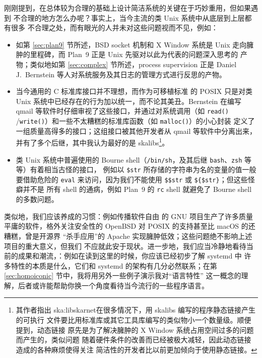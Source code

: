 刚刚提到，在总体较为合理的基础上设计简洁系统的关键在于巧妙重用，但如果遇到
不合理的地方怎么办呢？事实上，当今主流的类 Unix 系统中从底层到上层都有很多
不合理之处，而有眼光的人并未对这些问题视而不见，例如：
\begin{itemize}
\item 如第 \ref{sec:plan9} 节所述，BSD socket 机制和 X Window 系统是 Unix
	走向臃肿的里程碑，而 Plan~9 正是 Unix 先驱对以此为代表的问题深入思考的
	产物；类似地如第 \ref{sec:complex} 节所述，process supervision 正是
	Daniel J.\ Bernstein 等人对系统服务及其日志的管理方式进行反思的产物。
\item 当今通用的 C 标准库接口并不理想，而作为可移植标准
	的 POSIX 只是对类 Unix 系统中已经存在的行为加以统一，而不论其美丑。Bernstein
	在编写 qmail 等软件时仔细审视了这些接口，并通过对系统调用（如 \verb|read()|%
	/\verb|write()|）和一些不太糟糕的标准库函数（如 \verb|malloc()|）的小心封装
	定义了一组质量高得多的接口；这组接口被其他开发者从 qmail 等软件中分离出来，
	并有了多个后继，其中我认为最好的是 skalibs\footnote{其作者指出\cupercite%
	{ska:libskarnet}在很多情况下，用 skalibs 编写的程序静态链接产生的可执行
	文件要比用标准库或其它工具库编写的类似物小一个数量级。顺便提到，动态链接
	原先是为了解决臃肿的 X Window 系统占用空间过多的问题而产生的，类似问题
	随着硬件条件的改善而已经被极大减轻，因此动态链接造成的各种麻烦使得关注
	简洁性的开发者比以前更加倾向于使用静态链接。}。
\item 类 Unix 系统中普遍使用的 Bourne shell（\verb|/bin/sh|，及其后继
	\verb|bash|、\verb|zsh| 等等）有着相当古怪的接口，
	例如以 \verb|$str| 所存储的字符串为名的变量的值一般要借助危险的 \verb|eval|
	来访问，因为我们不能使用 \verb|$$str| 或 \verb|${$str}|；但这些怪癖并不是
	所有 shell 的通病，例如 Plan~9 的 \verb|rc| shell 就避免了
	Bourne shell 的多数问题。
\end{itemize}
类似地，我们应该养成的习惯：例如传播软件自由
的 GNU 项目生产了许多质量平庸的软件，格外关注安全性的
OpenBSD 对 POSIX 的支持甚至比 macOS 的还糟糕，曾是开源界
“杀手应用”的 Apache 实现臃肿低效；这些问题绝不影响上述项目的重大意义，但我们
不应就此安于现状。进一步地，我们应当冷静地看待当前的成果和潮流，：例如在读到这里的时候，你应该已经初步了解 systemd 中
许多特性的本质是什么，它们和 systemd 的架构有几分必然联系；在第
\ref{sec:homoiconic} 节中，我将用另外一些例子演示我对“语言特性”
这一概念的理解，后者或许能帮助你换一个角度看待当今流行的一些程序语言。

